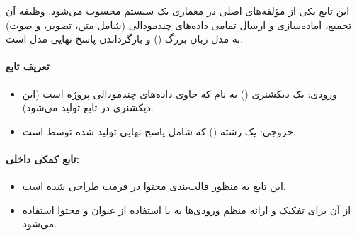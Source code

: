 \documentclass{article}
\begin{document}
این تابع  یکی از مؤلفه‌های اصلی در معماری یک سیستم  محسوب می‌شود. وظیفه آن تجمیع، آماده‌سازی و ارسال تمامی داده‌های چندمودالی (شامل متن، تصویر، و صوت) به مدل زبان بزرگ () و بازگرداندن پاسخ نهایی مدل است. 

\paragraph{تعریف تابع}
\begin{itemize}
    \item ورودی: یک دیکشنری () به نام  که حاوی داده‌های چندمودالی پروژه است (این دیکشنری در تابع  تولید می‌شود).
    \item خروجی: یک رشته () که شامل پاسخ نهایی تولید شده توسط  است.
\end{itemize}

\paragraph{تابع کمکی داخلی: }
\begin{itemize}
    \item این تابع به منظور قالب‌بندی محتوا در فرمت  طراحی شده است.
    \item از آن برای تفکیک و ارائه منظم ورودی‌ها به  با استفاده از عنوان و محتوا استفاده می‌شود.
\end{itemize}
\end{document}
